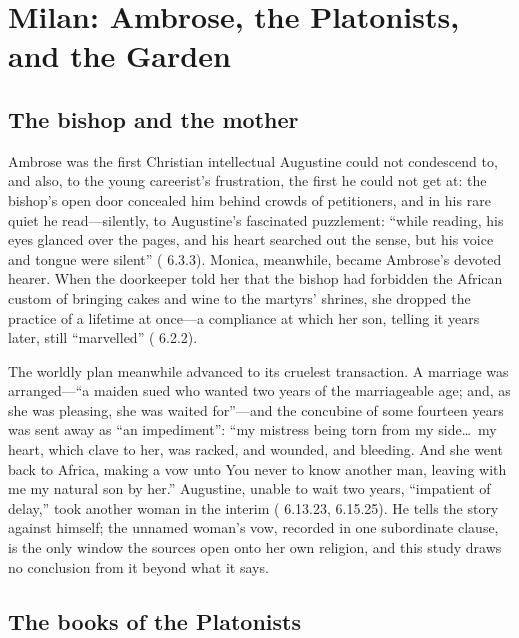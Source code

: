 \section{Milan: Ambrose, the Platonists, and the Garden}

\subsection{The bishop and the mother}

Ambrose was the first Christian intellectual Augustine could not condescend
to, and also, to the young careerist's frustration, the first he could not
get at: the bishop's open door concealed him behind crowds of petitioners,
and in his rare quiet he read---silently, to Augustine's fascinated
puzzlement: ``while reading, his eyes glanced over the pages, and his heart
searched out the sense, but his voice and tongue were silent''
( 6.3.3). Monica, meanwhile, became Ambrose's devoted
hearer. When the doorkeeper told her that the bishop had forbidden the
African custom of bringing cakes and wine to the martyrs' shrines, she
dropped the practice of a lifetime at once---a compliance at which her son,
telling it years later, still ``marvelled'' ( 6.2.2).

The worldly plan meanwhile advanced to its cruelest transaction. A marriage
was arranged---``a maiden sued who wanted two years of the marriageable age;
and, as she was pleasing, she was waited for''---and the concubine of some
fourteen years was sent away as ``an impediment'': ``my mistress being torn
from my side\ldots\ my heart, which clave to her, was racked, and wounded,
and bleeding. And she went back to Africa, making a vow unto You never to
know another man, leaving with me my natural son by her.'' Augustine, unable
to wait two years, ``impatient of delay,'' took another woman in the interim
( 6.13.23, 6.15.25). He tells the story against himself;
the unnamed woman's vow, recorded in one subordinate clause, is the only
window the sources open onto her own religion, and this study draws no
conclusion from it beyond what it says.

\subsection{The books of the Platonists}

